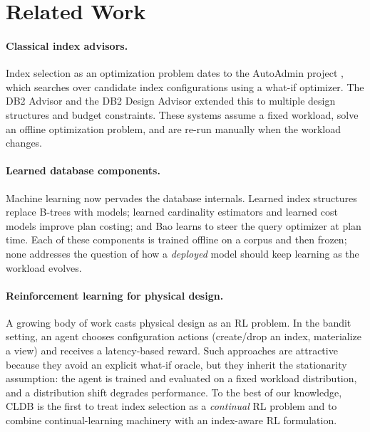 \section{Related Work}
\label{sec:related}

\paragraph{Classical index advisors.}
Index selection as an optimization problem dates to the AutoAdmin project
\citep{chaudhuri1997autoadmin}, which searches over candidate index
configurations using a what-if optimizer. The DB2 Advisor
\citep{valentin2000db2advisor} and the DB2 Design Advisor
\citep{zilio2004db2design} extended this to multiple design structures and budget
constraints. These systems assume a fixed workload, solve an offline
optimization problem, and are re-run manually when the workload changes.

\paragraph{Learned database components.}
Machine learning now pervades the database internals. Learned index structures
\citep{kraska2018case} replace B-trees with models; learned cardinality
estimators \citep{kipf2019learnedcardinalities} and learned cost models
\citep{marcus2019learnedcost} improve plan costing; and Bao \citep{marcus2021bao}
learns to steer the query optimizer at plan time. Each of these components is
trained offline on a corpus and then frozen; none addresses the question of how a
\emph{deployed} model should keep learning as the workload evolves.

\paragraph{Reinforcement learning for physical design.}
A growing body of work casts physical design as an RL problem. In the bandit
setting, an agent chooses configuration actions (create/drop an index,
materialize a view) and receives a latency-based reward. Such approaches are
attractive because they avoid an explicit what-if oracle, but they inherit the
stationarity assumption: the agent is trained and evaluated on a fixed workload
distribution, and a distribution shift degrades performance. To the best of our
knowledge, CLDB is the first to treat index selection as a \emph{continual} RL
problem and to combine continual-learning machinery with an index-aware RL
formulation.

